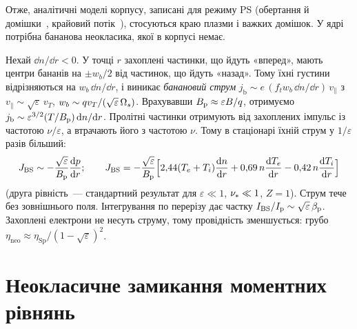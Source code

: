Отже, аналітичні моделі корпусу, записані для режиму PS (обертання й домішки~\cite{Sigmar1987,Wong1987}, крайовий потік~\cite{Singh2004}), стосуються краю плазми і важких домішок. У ядрі потрібна бананова неокласика, якої в корпусі немає.

\begin{outofcorpus}
Нехай $\dd n/\dd r<0$. У точці $r$ захоплені частинки, що йдуть «вперед», мають центри бананів на $\pm w_b/2$ від частинок, що йдуть «назад». Тому їхні густини відрізняються на $w_b\,\dd n/\dd r$, і виникає \emph{банановий струм} $j_{\mathrm b}\sim e\,(f_t w_b\,\dd n/\dd r)\,v_\parallel$ з $v_\parallel\sim\sqrt\varepsilon\,v_T$, $w_b\sim qv_T/(\sqrt\varepsilon\,\Omega_{s})$. Врахувавши $B_{\mathrm{p}}\approx\varepsilon B/q$, отримуємо $j_{\mathrm b}\sim\varepsilon^{3/2}(T/B_{\mathrm{p}})\,\mathrm{d} n/\mathrm{d} r$. Пролітні частинки отримують від захоплених імпульс із частотою $\nu/\varepsilon$, а втрачають його з частотою $\nu$. Тому в стаціонарі їхній струм у $1/\varepsilon$ разів більший:
\begin{equation}\label{eq:05-jbs}
  J_{\mathrm{BS}}\sim-\frac{\sqrt\varepsilon}{B_{\mathrm{p}}}\frac{\mathrm{d} p}{\mathrm{d} r};\qquad
  J_{\mathrm{BS}}=-\frac{\sqrt\varepsilon}{B_{\mathrm{p}}}\Big[2{,}44(T_e+T_i)\frac{\mathrm{d} n}{\mathrm{d} r}+0{,}69\,n\frac{\mathrm{d} T_e}{\mathrm{d} r}-0{,}42\,n\frac{\mathrm{d} T_i}{\mathrm{d} r}\Big]
\end{equation}
(друга рівність~--- стандартний результат для $\varepsilon\ll1$, $\nu_{*}\ll1$, $Z=1$). Струм тече без зовнішнього поля. Інтегрування по перерізу дає частку $I_{\mathrm{BS}}/I_{\mathrm{p}}\sim\sqrt\varepsilon\,\beta_{\mathrm{p}}$. Захоплені електрони не несуть струму, тому провідність зменшується: грубо $\eta_{\mathrm{neo}}\approx\eta_{\mathrm{Sp}}/(1-\sqrt\varepsilon)^2$.
\end{outofcorpus}

\section{Неокласичне замикання моментних рівнянь}\label{sec:05-closure}

